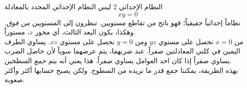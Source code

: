 \begin{surferPage}[إحداثيات 2]{النظام الإحداثي 2}
ليس النظام الإحداثي المحدد بالمعادلة 
\[xy=0\]
نظاماً إحداثياً حقيقياً؛ فهو ناتج من تقاطع مستويين. تنظرون إلى المستويين {\it من فوق}. وهكذا، يكون البعد الثالث، أي محور $z$، مستوراً. \\
\vspace{0.3cm}
من $x=0$ نحصل على مستوي $yz$ ومن $y=0$ نحصل على مستوي $xz$. 
يساوي الطرف اليمين في كلتي المعادلتين صفراً. عند ضربهما، يتم عرضهما سوياً لأن حاصل الضرب يساوي صفراً إذا كان احد العوامل يساوي صفراً. هذا يعني أنه يتم {\it جمع} السطحين. \\
بهذه الطريقة، يمكننا جمع قدر ما نريده من السطوح. ولكن يصبح حسابها أكثر وأكثر صعوبة.
\end{surferPage}
